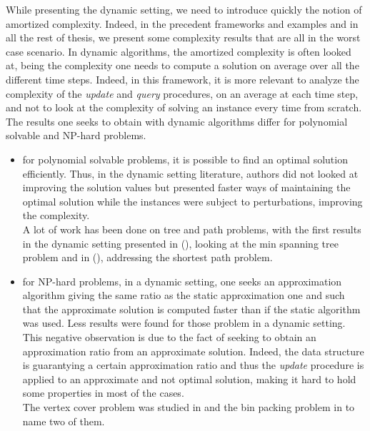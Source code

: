 \documentclass[a4paper]{book}
\begin{document}
While presenting the dynamic setting, we need to introduce quickly the notion of amortized complexity. Indeed, in the precedent frameworks and examples and in all the rest of thesis, we present some complexity results that are all in the worst case scenario. In dynamic algorithms, the amortized complexity is often looked at, being the complexity one needs to compute a solution on average over all the different time steps. Indeed, in this framework, it is more relevant to analyze the complexity of the \textit{update} and \textit{query} procedures, on an average at each time step, and not to look at the complexity of solving an instance every time from scratch.\\
The results one seeks to obtain with dynamic algorithms differ for polynomial solvable and NP-hard problems.
\begin{itemize}
    \item for polynomial solvable problems, it is possible to find an optimal solution efficiently. Thus, in the dynamic setting literature, authors did not looked at improving the solution values but presented faster ways of maintaining the optimal solution while the instances were subject to perturbations, improving the complexity. \\
    A lot of work has been done on tree and path problems, with the first results in the dynamic setting presented in (\cite{frederickson1985data}), looking at the {\sc min spanning tree} problem and in (\cite{even1985updating}), addressing the {\sc shortest path} problem.
    
    \item for NP-hard problems, in a dynamic setting, one seeks an approximation algorithm giving the same ratio as the static approximation one and such that the approximate solution is computed faster than if the static algorithm was used. Less results were found for those problem in a dynamic setting. This negative observation is due to the fact of seeking to obtain an approximation ratio from an approximate solution. Indeed, the data structure is guarantying a certain approximation ratio and thus the \textit{update} procedure is applied to an approximate and not optimal solution, making it hard to hold some properties in most of the cases. \\
    The {\sc vertex cover} problem was studied in \cite{IvkovicL93} and the {\sc bin packing} problem in \cite{2IvkovicL93} to name two of them.
    
    
\end{itemize}
\end{document}

